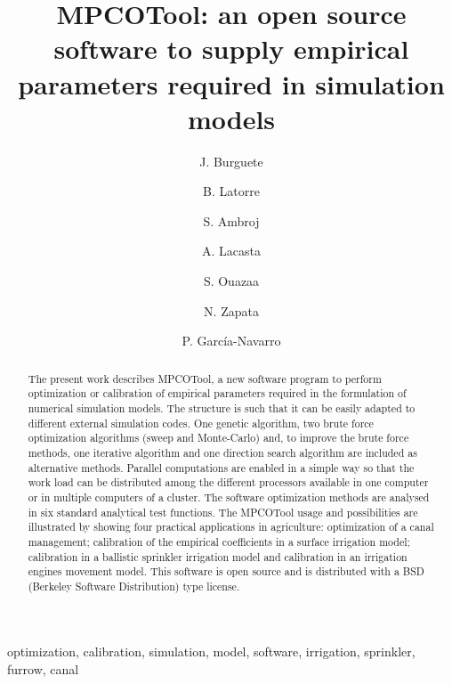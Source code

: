 \documentclass[review,authoryear]{elsarticle}
\begin{document}
\title{MPCOTool: an open source software to supply empirical parameters
required in simulation models}

\author[eead,bifi]{J. Burguete}

\author[eead]{B. Latorre}

\author[kit]{S. Ambroj}

\author[unizar]{A. Lacasta}

\author[eead]{S. Ouazaa}

\author[eead]{N. Zapata}

\author[unizar]{P. García-Navarro}


\address[eead]{Soil and Water, EEAD / CSIC.
P.O. Box 13034, 50080~Zaragoza, Spain.}
\address[bifi]{BIFI: Instituto de Biocomputación y Física de Sistemas Complejos,
Universidad de Zaragoza.
Mariano Esquillor, Edificio I+D, 50009~Zaragoza, Spain.}
\address[kit]{Steinbuch Centre for Computing (SCC),
Karlsruhe Institute of Technology (KIT).
KIT-Campus Nord, Hermann von Helmholtzplatz 1, 76344 Eggenstein - Leopoldshafen,
Germany.}
\address[unizar]{Fluid Mechanics, LIFTEC, CSIC-Universidad de Zaragoza.
María de Luna 3, 50018~Zaragoza, Spain.}

\begin{keyword}
optimization, calibration, simulation, model, software, irrigation, sprinkler,
furrow, canal
\end{keyword}

\begin{abstract}
The present work describes MPCOTool, a new software program to perform
optimization or calibration of empirical parameters required in the
formulation of numerical simulation models. The structure is such that it can be
easily adapted to different external simulation codes.
One genetic algorithm, two brute force optimization algorithms (sweep and
Monte-Carlo) and,
to improve the brute force methods, one iterative algorithm and one direction
search algorithm are included as alternative methods.
Parallel computations are enabled in a simple way so that the work load can be
distributed among the different processors available in one computer or in
multiple computers of a cluster.
The software optimization methods are analysed in six standard analytical test
functions.
The MPCOTool usage and possibilities are illustrated by showing four practical
applications in agriculture: optimization of a canal management; calibration of
the empirical coefficients in a surface irrigation model; calibration in a
ballistic sprinkler irrigation model and calibration in an irrigation engines
movement model.
This software is open source and is distributed with a BSD (Berkeley Software
Distribution) type license.
\end{abstract}
\end{document}
